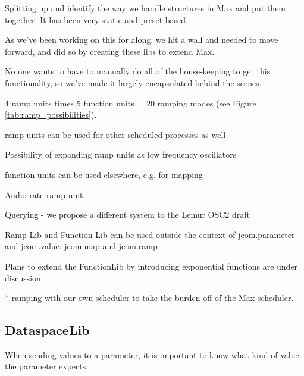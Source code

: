 \documentclass{article}
\begin{document}
Splitting up and identify the way we handle structures in Max and put them together.  It has been very static and preset-based.

As we've been working on this for along, we hit a wall and needed to move forward, and did so by creating these libs to extend Max.  

No one wants to have to manually do all of the house-keeping to get this functionality, so we've made it largely encapsulated behind the scenes.


4 ramp units times 5 function units = 20 ramping modes (see Figure \ref{tab:ramp_possibilities}).

ramp units can be used for other scheduled processes as well

Possibility of expanding ramp units as low frequency oscillators

function units can be used elsewhere, e.g. for mapping

Audio rate ramp unit.



Querying - we propose a different system to the Lemur OSC2 draft

Ramp Lib and Function Lib can be used outside the context of jcom.parameter and jcom.value: jcom.map and jcom.ramp


Plans to extend the FunctionLib by introducing exponential functions are under discussion. %


* ramping with our own scheduler to take the burden off of the Max scheduler.


\subsection{DataspaceLib} %
\label{sec:dataspacelib}

When sending values to a parameter, it is important to know what kind of value the parameter expects.
\end{document}
